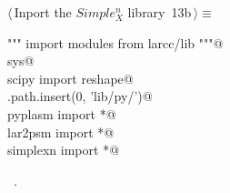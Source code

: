 \documentclass[11pt,oneside]{article}	%
\begin{document}
\begin{flushleft} \small
\begin{minipage}{\linewidth} \label{scrap19}
\protect{}$\langle\,$Inport the $Simple_X^n$ library\nobreak\ {\footnotesize 13b}$\,\rangle\equiv$
\vspace{-1ex}
\begin{list}{}{} \item
\mbox{}\verb@""" import modules from larcc/lib """@\\
\mbox{}\verb@import sys@\\
\mbox{}\verb@from scipy import reshape@\\
\mbox{}\verb@sys.path.insert(0, 'lib/py/')@\\
\mbox{}\verb@from pyplasm import *@\\
\mbox{}\verb@from lar2psm import *@\\
\mbox{}\verb@from simplexn import *@\\
\mbox{}\verb@@{\NWsep}
\end{list}
\vspace{-1ex}
\footnotesize\addtolength{\baselineskip}{-1ex}
\begin{list}{}{\setlength{\itemsep}{-\parsep}\setlength{\itemindent}{-\leftmargin}}
\item \NWtxtMacroRefIn\ .
\end{list}
\end{minipage}\\[4ex]
\end{flushleft}


\end{document}

